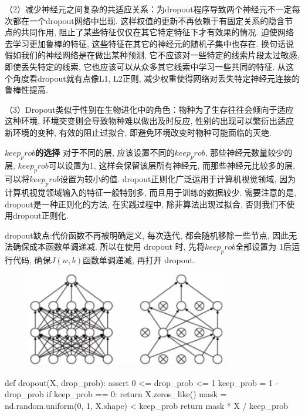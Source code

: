 \documentclass[a4paper]{article}
\theoremstyle{definition}
\numberwithin{equation}{section}
\begin{document}
（2）减少神经元之间复杂的共适应关系：为dropout程序导致两个神经元不一定每次都在一个dropout网络中出现. 这样权值的更新不再依赖于有固定关系的隐含节点的共同作用, 阻止了某些特征仅仅在其它特定特征下才有效果的情况. 迫使网络去学习更加鲁棒的特征, 这些特征在其它的神经元的随机子集中也存在. 换句话说假如我们的神经网络是在做出某种预测, 它不应该对一些特定的线索片段太过敏感, 即使丢失特定的线索, 它也应该可以从众多其它线索中学习一些共同的特征. 从这个角度看dropout就有点像L1, L2正则, 减少权重使得网络对丢失特定神经元连接的鲁棒性提高. 

（3）Dropout类似于性别在生物进化中的角色：物种为了生存往往会倾向于适应这种环境, 环境突变则会导致物种难以做出及时反应, 性别的出现可以繁衍出适应新环境的变种, 有效的阻止过拟合, 即避免环境改变时物种可能面临的灭绝.  

\textbf{$keep_prob$的选择}
对于不同的层, 应该设置不同的$keep_prob$, 那些神经元数量较少的层, $keep_prob$可以设置为1, 这样会保留该层所有神经元, 而那些神经元比较多的层, 可以将$keep_prob$设置为较小的值. 
dropout正则化广泛运用于计算机视觉领域, 因为计算机视觉领域输入的特征一般特别多, 而且用于训练的数据较少. 需要注意的是, dropout是一种正则化的方法, 在实践过程中, 除非算法出现过拟合, 否则我们不使用dropout正则化. 

dropout缺点:代价函数不再被明确定义, 每次迭代, 都会随机移除一些节点, 因此无法确保成本函数单调递减. 所以在使用 dropout 时, 先将$keep_prob$全部设置为 1后运行代码, 确保$J(w, b)$函数单调递减, 再打开 dropout. 


\begin{figure}[!ht]
\center
\includegraphics[width=0.8\textwidth]{dropout.png}
\end{figure}

\begin{python}
def dropout(X,  drop_prob):
    assert 0 <= drop_prob <= 1
    keep_prob = 1 - drop_prob
    if keep_prob == 0:
        return X.zeros_like()
    mask = nd.random.uniform(0,  1,  X.shape) < keep_prob
    return mask * X / keep_prob
\end{python}
\end{document}
